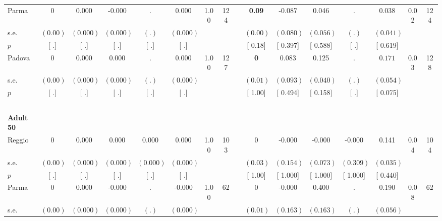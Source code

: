 \begin{longtable}{L{8em} c c c c c c c p{1em} c c c c c c c}
\quad \quad \quad Parma& 0 &     0.000 &    -0.000 &         . &     0.000 &      1.00 &       124 & & \textbf{     0.09} &    -0.087 &     0.046 &         . &     0.038 &      0.02 &       124  \\*
\quad \quad \quad \quad s.e.& $ (     0.00)$ & $ (    0.000)$ & $ (    0.000)$ & $ (        .)$ & $ (    0.000)$ & & & & $ (     0.00)$ & $ (    0.080)$ & $ (    0.056)$ & $ (        .)$ & $ (    0.041)$ & &  \\*
\quad \quad \quad \quad $ p$ & [        .] & [        .] & [        .] & [        .] & [        .] & & & & [     0.18] & [    0.397] & [    0.588] & [        .] & [    0.619] & &  \\[1em]
\quad \quad \quad Padova& 0 &     0.000 &     0.000 &         . &     0.000 &      1.00 &       127 & & \textbf{0} &     0.083 &     0.125 &         . & $ \mathbf{    0.171}$ &      0.03 &       128  \\*
\quad \quad \quad \quad s.e.& $ (     0.00)$ & $ (    0.000)$ & $ (    0.000)$ & $ (        .)$ & $ (    0.000)$ & & & & $ (     0.01)$ & $ (    0.093)$ & $ (    0.040)$ & $ (        .)$ & $ (    0.054)$ & &  \\*
\quad \quad \quad \quad $ p$ & [        .] & [        .] & [        .] & [        .] & [        .] & & & & [     1.00] & [    0.494] & [    0.158] & [        .] & [    0.075] & &  \\[1em]
~\\[1em]
\quad \quad \textbf{Adult 50} & & & & & & & & & & & & & & & \\* 
\quad \quad \quad Reggio& 0 &     0.000 &     0.000 &     0.000 &     0.000 &      1.00 &       103 & & 0 &    -0.000 &    -0.000 &    -0.000 &     0.141 &      0.04 &       104  \\*
\quad \quad \quad \quad s.e.& $ (     0.00)$ & $ (    0.000)$ & $ (    0.000)$ & $ (    0.000)$ & $ (    0.000)$ & & & & $ (     0.03)$ & $ (    0.154)$ & $ (    0.073)$ & $ (    0.309)$ & $ (    0.035)$ & &  \\*
\quad \quad \quad \quad $ p$ & [        .] & [        .] & [        .] & [        .] & [        .] & & & & [     1.00] & [    1.000] & [    1.000] & [    1.000] & [    0.440] & &  \\[1em]
\quad \quad \quad Parma& 0 &     0.000 &    -0.000 &         . &    -0.000 &      1.00 &        62 & & 0 &    -0.000 & $ \mathbf{    0.400}$ &         . &     0.190 &      0.08 &        62  \\*
\quad \quad \quad \quad s.e.& $ (     0.00)$ & $ (    0.000)$ & $ (    0.000)$ & $ (        .)$ & $ (    0.000)$ & & & & $ (     0.01)$ & $ (    0.163)$ & $ (    0.163)$ & $ (        .)$ & $ (    0.056)$ & &  \\*

\end{longtable}
